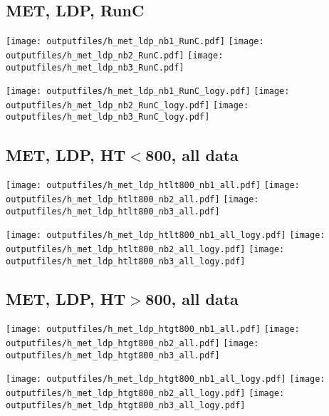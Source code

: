 \documentclass[11pt]{article}
\begin{document}
    \subsection{ MET, LDP, RunC}

    \noindent
     \texttt{[image: outputfiles/h\_met\_ldp\_nb1\_RunC.pdf]}
     \texttt{[image: outputfiles/h\_met\_ldp\_nb2\_RunC.pdf]}
     \texttt{[image: outputfiles/h\_met\_ldp\_nb3\_RunC.pdf]}

    \noindent
     \texttt{[image: outputfiles/h\_met\_ldp\_nb1\_RunC\_logy.pdf]}
     \texttt{[image: outputfiles/h\_met\_ldp\_nb2\_RunC\_logy.pdf]}
     \texttt{[image: outputfiles/h\_met\_ldp\_nb3\_RunC\_logy.pdf]}


    \subsection{ MET, LDP, HT$<$800, all data}

    \noindent
     \texttt{[image: outputfiles/h\_met\_ldp\_htlt800\_nb1\_all.pdf]}
     \texttt{[image: outputfiles/h\_met\_ldp\_htlt800\_nb2\_all.pdf]}
     \texttt{[image: outputfiles/h\_met\_ldp\_htlt800\_nb3\_all.pdf]}

    \noindent
     \texttt{[image: outputfiles/h\_met\_ldp\_htlt800\_nb1\_all\_logy.pdf]}
     \texttt{[image: outputfiles/h\_met\_ldp\_htlt800\_nb2\_all\_logy.pdf]}
     \texttt{[image: outputfiles/h\_met\_ldp\_htlt800\_nb3\_all\_logy.pdf]}


    \subsection{ MET, LDP, HT$>$800, all data}

    \noindent
     \texttt{[image: outputfiles/h\_met\_ldp\_htgt800\_nb1\_all.pdf]}
     \texttt{[image: outputfiles/h\_met\_ldp\_htgt800\_nb2\_all.pdf]}
     \texttt{[image: outputfiles/h\_met\_ldp\_htgt800\_nb3\_all.pdf]}

    \noindent
     \texttt{[image: outputfiles/h\_met\_ldp\_htgt800\_nb1\_all\_logy.pdf]}
     \texttt{[image: outputfiles/h\_met\_ldp\_htgt800\_nb2\_all\_logy.pdf]}
     \texttt{[image: outputfiles/h\_met\_ldp\_htgt800\_nb3\_all\_logy.pdf]}
\end{document}
